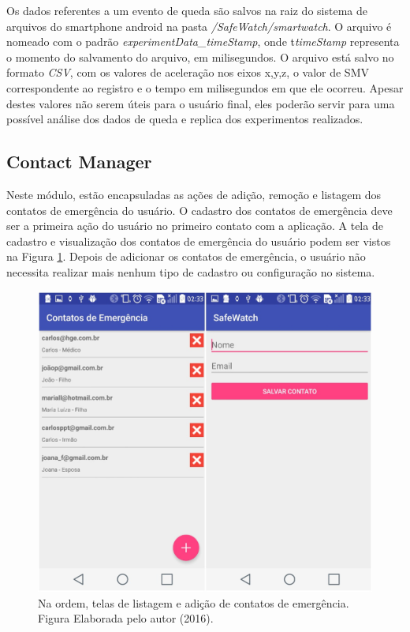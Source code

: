 Os dados referentes a um evento de queda são salvos na raiz do sistema de arquivos do smartphone android na pasta \textit{/SafeWatch/smartwatch}. O arquivo é nomeado com o padrão \textit{experimentData\_timeStamp}, onde t\textit{timeStamp} representa o momento do salvamento do arquivo, em milisegundos. O arquivo está salvo no formato \textit{CSV}, com os valores de aceleração nos eixos x,y,z, o valor de \ac{SMV} correspondente ao registro e o tempo em milisegundos em que ele ocorreu. Apesar destes valores não serem úteis para o usuário final, eles poderão servir para uma possível análise dos dados de queda e replica dos experimentos realizados. 

\subsection{Contact Manager}
Neste módulo, estão encapsuladas as ações de adição, remoção e listagem dos contatos de emergência do usuário. O cadastro dos contatos de emergência deve ser a primeira ação do usuário no primeiro contato com a aplicação. A tela de cadastro e visualização dos contatos de emergência do usuário podem ser vistos na Figura \ref{fig:contacts}. Depois de adicionar os contatos de emergência, o usuário não necessita realizar mais nenhum tipo de cadastro ou configuração no sistema.


\begin{figure}
	\centering
	\includegraphics[scale=0.4]{imagens/add_list_contacts.png}
	\caption{Na ordem, telas de listagem e adição de contatos de emergência. Figura Elaborada pelo autor (2016).}
	\label{fig:contacts}
\end{figure}


